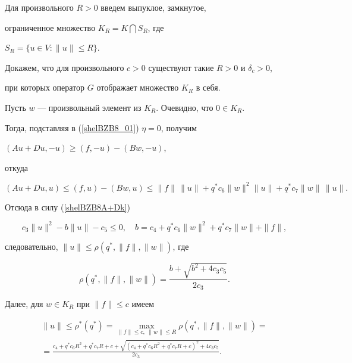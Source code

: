 \begin{pf}


Для произвольного $R > 0$ введем выпуклое, замкнутое,


ограниченное множество $K_R=K \bigcap S_R$, где


$S_R= \{u \in V : \|u\|\leq R \}$.


Докажем, что для произвольного $c>0$ существуют такие $R>0$ и $\delta_c>0$,


при которых оператор $G$ отображает множество $K_R$ в себя.





Пусть $w$ --- произвольный элемент из $K_R$. Очевидно, что $0 \in K_R$.


Тогда, подставляя в (\ref{shelBZB8_01}) $\eta=0$, получим


$(Au+Du,-u) \geq (f, -u)-(Bw,-u)$,


откуда


$$


(Au+Du,u) \leq (f, u)-(Bw,u) \leq \| f \|\, \|u\|+ q^* c_6 \|w\|^2 


\|u\|+q^* c_7 \|w\|\, \|u\|.


$$


Отсюда в силу (\ref{shelBZB8A+Dk})


$$


c_3 \|u\|^2-b \|u\|-c_5 \leq 0, \quad b=c_4 +


q^* c_6 \|w\|^2+q^* c_7 \|w\|+\| f \|,


$$


следовательно, $ \|u\| \leq \rho (q^*, \| f \|, \|w\|)$, где


$$


\rho (q^*, \| f \|, \|w\|)=\frac{b +


\sqrt{b^2+ 4 c_3 c_5}}{2 c_3}.


$$





Далее, для $w \in K_R$ при $\| f \| \leq c$ имеем


\begin{multline*}


\|u\| \leq \rho^*(q^*)=


\max_{\| f \| \leq c,\; \| w \| \leq R} \rho(q^*,\| f \|,\|w\|)=\\


%


= \frac{c_4+q^* c_6 R^2+q^* c_7 R+c +


\sqrt{(c_4+q^* c_6 R^2+q^* c_7 R+c)^2+ 4 c_3 c_5}}{2 c_3}.



\end{multline*}
\end{pf}

